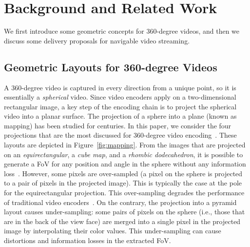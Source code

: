 \section{Background and Related Work}
\label{sec:related}

We first introduce some geometric concepts for 360-degree videos, and then we discuss
some delivery proposals for navigable video streaming.

\subsection{Geometric Layouts for 360-degree Videos}

A 360-degree video is captured in every direction from a unique 
point, so it is essentially a \emph{spherical} video. Since video encoders apply on a
two-dimensional rectangular image, a key step of the encoding chain is to project the spherical 
video into a planar
surface.
The projection of a sphere into a plane (known as mapping) has been studied
for centuries. In this paper, we consider the four projections that are the most discussed for 
360-degree video encoding~\cite{yu_framework_2015}. These layouts are depicted in 
Figure~\ref{fig:mapping}.
From
the images that are
projected on an \textit{equirectangular}, a \textit{cube map}, and a 
\textit{rhombic dodecahedron}, it is possible
to generate a \ac{FoV}
for any position and angle in the sphere without any information 
loss~\cite{Ng2005, fu_rhombic_2009}. However, some pixels
are over-sampled (a pixel on the sphere is projected to a pair of pixels in the 
projected image). This is typically the case at the pole for the equirectangular projection.
This over-sampling degrades the
performance of traditional video encoders~\cite{wojciechowski_h.264_2006,
yu_framework_2015}. 
On the
contrary, the projection into a pyramid layout causes under-sampling: some pairs of pixels 
on the sphere (i.e., those that are 
in the back of the view face) are merged into a single pixel in 
the projected image by interpolating their 
color values. This under-sampling can cause distortions and information losses in the extracted 
FoV. 

